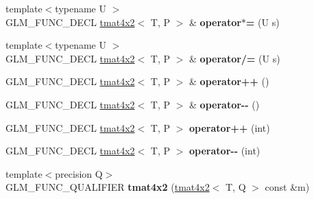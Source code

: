 \begin{DoxyCompactItemize}
\item 
\hypertarget{structglm_1_1detail_1_1tmat4x2_a64135bb813a4b55236de482a753a0b94}{{\footnotesize template$<$typename U $>$ }\\G\-L\-M\-\_\-\-F\-U\-N\-C\-\_\-\-D\-E\-C\-L \hyperlink{structglm_1_1detail_1_1tmat4x2}{tmat4x2}$<$ T, P $>$ \& {\bfseries operator$\ast$=} (U s)}\label{structglm_1_1detail_1_1tmat4x2_a64135bb813a4b55236de482a753a0b94}

\item 
\hypertarget{structglm_1_1detail_1_1tmat4x2_a1d3b62413da2a83289fcba7569ff8486}{{\footnotesize template$<$typename U $>$ }\\G\-L\-M\-\_\-\-F\-U\-N\-C\-\_\-\-D\-E\-C\-L \hyperlink{structglm_1_1detail_1_1tmat4x2}{tmat4x2}$<$ T, P $>$ \& {\bfseries operator/=} (U s)}\label{structglm_1_1detail_1_1tmat4x2_a1d3b62413da2a83289fcba7569ff8486}

\item 
\hypertarget{structglm_1_1detail_1_1tmat4x2_a601812e90a1d3f22cecdfded3e440d70}{G\-L\-M\-\_\-\-F\-U\-N\-C\-\_\-\-D\-E\-C\-L \hyperlink{structglm_1_1detail_1_1tmat4x2}{tmat4x2}$<$ T, P $>$ \& {\bfseries operator++} ()}\label{structglm_1_1detail_1_1tmat4x2_a601812e90a1d3f22cecdfded3e440d70}

\item 
\hypertarget{structglm_1_1detail_1_1tmat4x2_ad648e4a3b4f36d702b584414291734b0}{G\-L\-M\-\_\-\-F\-U\-N\-C\-\_\-\-D\-E\-C\-L \hyperlink{structglm_1_1detail_1_1tmat4x2}{tmat4x2}$<$ T, P $>$ \& {\bfseries operator-\/-\/} ()}\label{structglm_1_1detail_1_1tmat4x2_ad648e4a3b4f36d702b584414291734b0}

\item 
\hypertarget{structglm_1_1detail_1_1tmat4x2_a1fe0b314b257ad441100c5d3686e4884}{G\-L\-M\-\_\-\-F\-U\-N\-C\-\_\-\-D\-E\-C\-L \hyperlink{structglm_1_1detail_1_1tmat4x2}{tmat4x2}$<$ T, P $>$ {\bfseries operator++} (int)}\label{structglm_1_1detail_1_1tmat4x2_a1fe0b314b257ad441100c5d3686e4884}

\item 
\hypertarget{structglm_1_1detail_1_1tmat4x2_a585f40b5e70d68bab7efa8a6e302e8d8}{G\-L\-M\-\_\-\-F\-U\-N\-C\-\_\-\-D\-E\-C\-L \hyperlink{structglm_1_1detail_1_1tmat4x2}{tmat4x2}$<$ T, P $>$ {\bfseries operator-\/-\/} (int)}\label{structglm_1_1detail_1_1tmat4x2_a585f40b5e70d68bab7efa8a6e302e8d8}

\item 
\hypertarget{structglm_1_1detail_1_1tmat4x2_adbb722f9fddaebd63f497f46b75d004b}{{\footnotesize template$<$precision Q$>$ }\\G\-L\-M\-\_\-\-F\-U\-N\-C\-\_\-\-Q\-U\-A\-L\-I\-F\-I\-E\-R {\bfseries tmat4x2} (\hyperlink{structglm_1_1detail_1_1tmat4x2}{tmat4x2}$<$ T, Q $>$ const \&m)}\label{structglm_1_1detail_1_1tmat4x2_adbb722f9fddaebd63f497f46b75d004b}


\end{DoxyCompactItemize}
